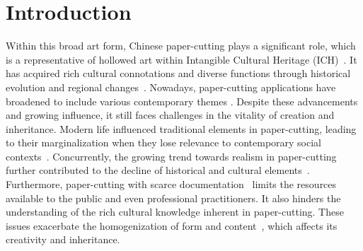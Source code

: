 \section{Introduction}
Within this broad art form, Chinese paper-cutting plays a significant role, which is a representative of hollowed art within Intangible Cultural Heritage (ICH)~\cite{Zhang:2021:dot, Wang:2021:dap, ich2009unesco}. It has acquired rich cultural connotations and diverse functions through historical evolution and regional changes~\cite{Cao:2023:the, Ma:2010:sof, Cui:2016:sot}. 
Nowadays, paper-cutting applications have broadened to include various contemporary themes \cite{Cao:2023:the, Liu:2009:rai, Ma:2010:sof}. Despite these advancements and growing influence, it still faces challenges in the vitality of creation and inheritance.
Modern life influenced traditional elements in paper-cutting, leading to their marginalization when they lose relevance to contemporary social contexts~\cite{Wang:2021:dap, Zhang:2018:sos}. Concurrently, the growing trend towards realism in paper-cutting further contributed to the decline of historical and cultural elements~\cite{Cui:2016:sot, Zhang:2018:sos}. Furthermore, paper-cutting with scarce documentation~\cite{Ma:2010:sof, Hu:2017:tda, Huang:2012:ICHprotecting} limits the resources available to the public and even professional practitioners. It also hinders the understanding of the rich cultural knowledge inherent in paper-cutting. These issues exacerbate the homogenization of form and content~\cite{Zhang:2018:sos}, which affects its creativity and inheritance.

